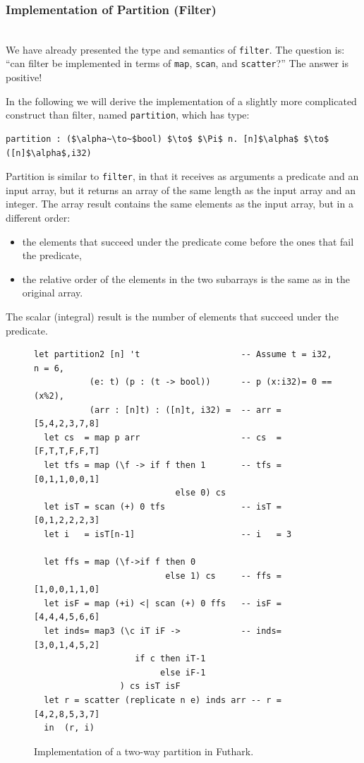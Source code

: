 \documentclass[acmsmall,review]{acmart}\settopmatter{printfolios=true,printccs=false,printacmref=false}
\begin{document}
\subsubsection{Implementation of Partition (Filter)}
\label{subsubsub:filter-impl}
$\mbox{ }$\\

We have already presented the type and semantics of \lstinline{filter}.
The question is: ``can filter be implemented in terms of \lstinline{map},
\lstinline{scan}, and \lstinline{scatter}?''
The answer is positive! 

In the following we will derive the implementation of a slightly more complicated 
construct than filter, named \lstinline{partition}, which has type:
\begin{lstlisting}[mathescape=true]
partition : ($\alpha~\to~$bool) $\to$ $\Pi$ n. [n]$\alpha$ $\to$ ([n]$\alpha$,i32) 
\end{lstlisting}\vspace{-2ex}
Partition is similar to \lstinline{filter}, in that it receives
as arguments a predicate and an input array, but it returns
an array of the same length as the input array and an integer.
The array result contains the same elements as the input array,
but in a different order: 
\begin{itemize}
    \item the elements that succeed under the predicate
            come before the ones that fail the predicate,
    \item the relative order of the elements in the two
            subarrays is the same as in the original array.
\end{itemize}
The scalar (integral) result is the number of elements that succeed 
under the predicate. 

\begin{figure}
\begin{lstlisting}[mathescape=true]
let partition2 [n] 't                    -- Assume t = i32, n = 6,
           (e: t) (p : (t -> bool))      -- p (x:i32)= 0 == (x%2),
           (arr : [n]t) : ([n]t, i32) =  -- arr = [5,4,2,3,7,8]
  let cs  = map p arr                    -- cs  = [F,T,T,F,F,T]
  let tfs = map (\f -> if f then 1       -- tfs = [0,1,1,0,0,1]
                            else 0) cs
  let isT = scan (+) 0 tfs               -- isT = [0,1,2,2,2,3]
  let i   = isT[n-1]                     -- i   = 3

  let ffs = map (\f->if f then 0 
                          else 1) cs     -- ffs = [1,0,0,1,1,0]
  let isF = map (+i) <| scan (+) 0 ffs   -- isF = [4,4,4,5,6,6]
  let inds= map3 (\c iT iF ->            -- inds= [3,0,1,4,5,2]
                    if c then iT-1 
                         else iF-1
                 ) cs isT isF
  let r = scatter (replicate n e) inds arr -- r = [4,2,8,5,3,7]            
  in  (r, i) 
\end{lstlisting}\vspace{-4ex}
\caption{Implementation of a two-way partition in Futhark.}
\label{fig:futhark-partition2}
\end{figure}
\end{document}
